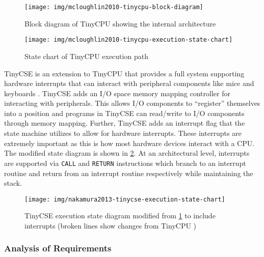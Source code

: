 \begin{figure}[t!]
    \centering
    \texttt{[image: img/mcloughlin2010-tinycpu-block-diagram]}
    \caption{Block diagram of TinyCPU showing the internal architecture \cite[p.~869]{McLoughlin2010}}
    \label{fig:mcloughlin2010-tinycpu-block-diagram}
    \texttt{[image: img/mcloughlin2010-tinycpu-execution-state-chart]}
    \caption{State chart of TinyCPU execution path \cite[p.~869]{McLoughlin2010}}
    \label{fig:mcloughlin2010-tinycpu-state-chart}
\end{figure}

TinyCSE is an extension to TinyCPU that provides a full system supporting hardware interrupts that can interact with peripheral components like mice and keyboards \cite{Nakamura2013}. TinyCSE adds an I/O space memory mapping controller for interacting with peripherals. This allows I/O components to ``register'' themselves into a position and programs in TinyCSE can read/write to I/O components through memory mapping. Further, TinyCSE adds an interrupt flag that the state machine utilizes to allow for hardware interrupts. These interrupts are extremely important as this is how most hardware devices interact with a CPU. The modified state diagram is shown in \cref{fig:nakamura2013-tinycse-execution-state-chart}. At an architectural level, interrupts are supported via \verb|CALL| and \verb|RETURN| instructions which branch to an interrupt routine and return from an interrupt routine respectively while maintaining the stack.

\begin{figure}[b!]
    \centering
    \texttt{[image: img/nakamura2013-tinycse-execution-state-chart]}
    \caption{TinyCSE execution state diagram modified from \cref{fig:mcloughlin2010-tinycpu-state-chart} to include interrupts (broken lines show changes from TinyCPU \cite{mcloughlin2010}) \cite[p.~640]{Nakamura2013}}
    \label{fig:nakamura2013-tinycse-execution-state-chart}
\end{figure}

\subsubsection*{Analysis of Requirements}

